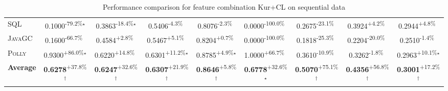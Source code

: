 \begin{table}[htbp]
\begin{tabular}{l|cccc|cccc}
\textsc{SQL} & \cellcolor{red!30}0.1000\textsuperscript{-79.2\%}$^\star$ & \cellcolor{red!30}0.3863\textsuperscript{-18.4\%}$^\star$ & \cellcolor{red!30}0.5406\textsuperscript{-4.3\%}$^{\,\,\,}$ & \cellcolor{red!30}0.8076\textsuperscript{-2.3\%}$^{\,\,\,}$ & \cellcolor{red!30}0.0000\textsuperscript{-100.0\%}$^{\,\,\,}$ & \cellcolor{red!30}0.2675\textsuperscript{-23.1\%}$^{\,\,\,}$ & \cellcolor{green!30}0.3924\textsuperscript{+4.2\%}$^{\,\,\,}$ & \cellcolor{green!30}0.2944\textsuperscript{+4.8\%}$^{\,\,\,}$ \\
\textsc{JavaGC} & \cellcolor{red!30}0.1600\textsuperscript{-66.7\%}$^{\,\,\,}$ & \cellcolor{green!30}0.4584\textsuperscript{+2.8\%}$^{\,\,\,}$ & \cellcolor{green!30}0.5467\textsuperscript{+5.1\%}$^{\,\,\,}$ & \cellcolor{green!30}0.8204\textsuperscript{+0.7\%}$^{\,\,\,}$ & \cellcolor{red!30}0.0000\textsuperscript{-100.0\%}$^{\,\,\,}$ & \cellcolor{red!30}0.1818\textsuperscript{-25.3\%}$^{\,\,\,}$ & \cellcolor{red!30}0.2204\textsuperscript{-20.0\%}$^{\,\,\,}$ & \cellcolor{red!30}0.2510\textsuperscript{-1.4\%}$^{\,\,\,}$ \\
\textsc{Polly} & \cellcolor{green!30}0.9300\textsuperscript{+86.0\%}$^\star$ & \cellcolor{green!30}0.6220\textsuperscript{+14.8\%}$^{\,\,\,}$ & \cellcolor{green!30}0.6301\textsuperscript{+11.2\%}$^\star$ & \cellcolor{green!30}0.8785\textsuperscript{+4.9\%}$^\star$ & \cellcolor{green!30}1.0000\textsuperscript{+66.7\%}$^{\,\,\,}$ & \cellcolor{red!30}0.3610\textsuperscript{-10.9\%}$^{\,\,\,}$ & \cellcolor{red!30}0.3262\textsuperscript{-1.8\%}$^{\,\,\,}$ & \cellcolor{green!30}0.2963\textsuperscript{+10.1\%}$^\star$ \\
\hline
\textbf{Average} & \cellcolor{green!30}\textbf{0.6278}\textsuperscript{+37.8\%}$^\dagger$ & \cellcolor{green!30}\textbf{0.6247}\textsuperscript{+32.6\%}$^\dagger$ & \cellcolor{green!30}\textbf{0.6307}\textsuperscript{+21.9\%}$^\dagger$ & \cellcolor{green!30}\textbf{0.8646}\textsuperscript{+5.8\%}$^\dagger$ & \cellcolor{green!30}\textbf{0.6778}\textsuperscript{+32.6\%}$^\star$ & \cellcolor{green!30}\textbf{0.5070}\textsuperscript{+75.1\%}$^\dagger$ & \cellcolor{green!30}\textbf{0.4356}\textsuperscript{+56.8\%}$^\dagger$ & \cellcolor{green!30}\textbf{0.3001}\textsuperscript{+17.2\%}$^\dagger$ \\
\hline
\end{tabular}
\caption{Performance comparison for feature combination Kur+CL on sequential data}
\label{tab:combo_Kur_CL_performance_sequential}
\end{table}